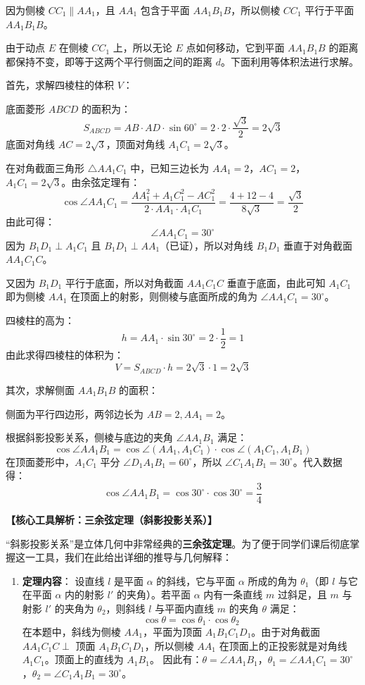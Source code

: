 \documentclass[11pt,a4paper]{ctexart}
\begin{document}
\begin{proof*}
因为侧棱 $CC_1 \parallel AA_1$，且 $AA_1$ 包含于平面 $AA_1B_1B$，所以侧棱 $CC_1$ 平行于平面 $AA_1B_1B$。\par
由于动点 $E$ 在侧棱 $CC_1$ 上，所以无论 $E$ 点如何移动，它到平面 $AA_1B_1B$ 的距离都保持不变，即等于这两个平行侧面之间的距离 $d$。下面利用等体积法进行求解。\par

首先，求解四棱柱的体积 $V$：\par
底面菱形 $ABCD$ 的面积为：
\[ S_{ABCD} = AB \cdot AD \cdot \sin 60^\circ = 2 \cdot 2 \cdot \frac{\sqrt{3}}{2} = 2\sqrt{3} \]
底面对角线 $AC = 2\sqrt{3}$，顶面对角线 $A_1C_1 = 2\sqrt{3}$。\par
在对角截面三角形 $\triangle AA_1C_1$ 中，已知三边长为 $AA_1 = 2$，$AC_1 = 2$，$A_1C_1 = 2\sqrt{3}$。由余弦定理有：
\[ \cos\angle AA_1C_1 = \frac{AA_1^2 + A_1C_1^2 - AC_1^2}{2 \cdot AA_1 \cdot A_1C_1} = \frac{4 + 12 - 4}{8\sqrt{3}} = \frac{\sqrt{3}}{2} \]
由此可得：
\[ \angle AA_1C_1 = 30^\circ \]
因为 $B_1D_1 \perp A_1C_1$ 且 $B_1D_1 \perp AA_1$（已证），所以对角线 $B_1D_1$ 垂直于对角截面 $AA_1C_1C$。\par
又因为 $B_1D_1$ 平行于底面，所以对角截面 $AA_1C_1C$ 垂直于底面，由此可知 $A_1C_1$ 即为侧棱 $AA_1$ 在顶面上的射影，则侧棱与底面所成的角为 $\angle AA_1C_1 = 30^\circ$。\par
四棱柱的高为：
\[ h = AA_1 \cdot \sin 30^\circ = 2 \cdot \frac{1}{2} = 1 \]
由此求得四棱柱的体积为：
\[ V = S_{ABCD} \cdot h = 2\sqrt{3} \cdot 1 = 2\sqrt{3} \]

其次，求解侧面 $AA_1B_1B$ 的面积：\par
侧面为平行四边形，两邻边长为 $AB = 2, AA_1 = 2$。\par
根据斜影投影关系，侧棱与底边的夹角 $\angle AA_1B_1$ 满足：
\[ \cos\angle AA_1B_1 = \cos\angle(AA_1, A_1C_1) \cdot \cos\angle(A_1C_1, A_1B_1) \]
在顶面菱形中，$A_1C_1$ 平分 $\angle D_1A_1B_1 = 60^\circ$，所以 $\angle C_1A_1B_1 = 30^\circ$。代入数据得：
\[ \cos\angle AA_1B_1 = \cos 30^\circ \cdot \cos 30^\circ = \frac{3}{4} \]

\vspace{0.2cm}
\noindent\textbf{【核心工具解析：三余弦定理（斜影投影关系）】}\par
“斜影投影关系”是立体几何中非常经典的\textbf{三余弦定理}。为了便于同学们课后彻底掌握这一工具，我们在此给出详细的推导与几何解释：

\begin{enumerate}
    \item \textbf{定理内容}：
    设直线 $l$ 是平面 $\alpha$ 的斜线，它与平面 $\alpha$ 所成的角为 $\theta_1$（即 $l$ 与它在平面 $\alpha$ 内的射影 $l'$ 的夹角）。若平面 $\alpha$ 内有一条直线 $m$ 过斜足，且 $m$ 与射影 $l'$ 的夹角为 $\theta_2$，则斜线 $l$ 与平面内直线 $m$ 的夹角 $\theta$ 满足：
    \[ \cos\theta = \cos\theta_1 \cdot \cos\theta_2 \]
    在本题中，斜线为侧棱 $AA_1$，平面为顶面 $A_1B_1C_1D_1$。由于对角截面 $AA_1C_1C \perp$ 顶面 $A_1B_1C_1D_1$，所以侧棱 $AA_1$ 在顶面上的正投影就是对角线 $A_1C_1$。顶面上的直线为 $A_1B_1$。
    因此有：$\theta = \angle AA_1B_1$，$\theta_1 = \angle AA_1C_1 = 30^\circ$，$\theta_2 = \angle C_1A_1B_1 = 30^\circ$。
    

\end{enumerate}
\end{proof*}
\end{document}
